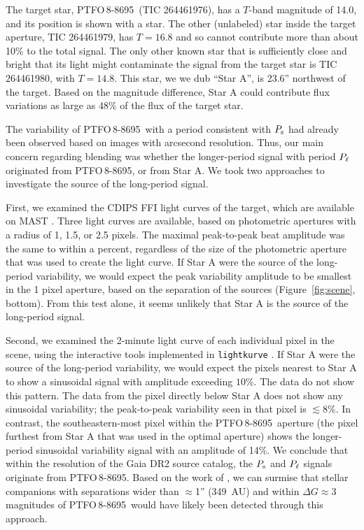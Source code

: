 \documentclass[12pt,twocolumn,tighten]{aastex62}
\newcommand{\ptfo}{PTFO$\,$8-8695}
\begin{document}
The target star, \ptfo\ (TIC 264461976), has a $T$-band magnitude of
14.0, and its position is shown with a star.  The other (unlabeled)
star inside the target aperture, TIC 264461979, has $T=16.8$ and so
cannot contribute more than about 10\% to the total signal.  The only
other known star that is sufficiently close and bright that its light
might contaminate the signal from the target star is TIC 264461980,
with $T=14.8$.  This star, we we dub ``Star A'', is 23.6'' northwest
of the target. Based on the magnitude difference, Star A could
contribute flux variations as large as 48\% of the flux of the target
star.

The variability of \ptfo\ with a period consistent with $P_{\rm s}$
had already been observed based on images with arcsecond resolution.
Thus, our main concern regarding blending was whether the
longer-period signal with period $P_{\rm \ell}$ originated from \ptfo,
or from Star A. We took two approaches to investigate the source of
the long-period signal.

First, we examined the CDIPS FFI light curves of the target, which are
available on MAST \citep{bouma_cluster_2019}. Three light curves are
available, based on photometric apertures with a radius of 1, 1.5, or
2.5 pixels. The maximal peak-to-peak beat amplitude was the same to
within a percent, regardless of the size of the photometric aperture
that was used to create the light curve.  If Star A were the source of
the long-period variability, we would expect the peak variability
amplitude to be smallest in the 1 pixel aperture, based on the
separation of the sources (Figure~\ref{fig:scene}, bottom).  From this
test alone, it seems unlikely that Star A is the source of the
long-period signal.

Second, we examined the 2-minute light curve of each individual pixel
in the scene, using the interactive tools implemented in
\texttt{lightkurve} \citep{lightkurve_2018}.  If Star A were the
source of the long-period variability, we would expect the pixels
nearest to Star A to show a sinusoidal signal with amplitude exceeding
$10\%$.  The data do not show this pattern.  The data from the pixel
directly below Star A does not show any sinusoidal variability; the
peak-to-peak variability seen in that pixel is $\lesssim 8\%$.  In
contrast, the southeastern-most pixel within the \ptfo\ aperture (the
pixel furthest from Star A that was used in the optimal aperture)
shows the longer-period sinusoidal variability signal with an
amplitude of 14\%.  We conclude that within the resolution of the Gaia
DR2 source catalog, the $P_{\rm s}$ and $P_{\rm \ell}$ signals
originate from \ptfo.  Based on the work of
\citet{ziegler_measuring_2018}, we can surmise that stellar companions
with separations wider than $\approx$1'' (349~AU) and within $\Delta G
\approx 3$ magnitudes of \ptfo\ would have likely been detected
through this approach. 
\end{document}
